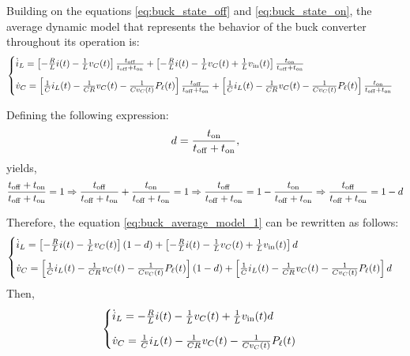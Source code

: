 Building on the equations \eqref{eq:buck_state_off} and \eqref{eq:buck_state_on}, the average dynamic model that represents the behavior of the buck converter throughout its operation is:
\begin{equation}
  \begin{cases}
    \dot i_L = \left[- \frac{R} L i(t) - \frac{1}{L} v_C(t) \right] \frac{t_{\rm{off}}}{t_{\rm{off}} + t_{\rm{on}}} + \left[- \frac{R} L i(t) - \frac{1}{L} v_C(t) + \frac{1}{L} v_{\rm{in}}(t)\right] \frac{t_{\rm{on}}}{t_{\rm{off}} + t_{\rm{on}}} \\[8pt]
    \dot v_C = \left[\frac{1}{C} i_L(t) - \frac{1}{C R} v_C(t) - \frac{1}{C v_C(t)} P_{\ell}(t)\right] \frac{t_{\rm{off}}}{t_{\rm{off}} + t_{\rm{on}}} + \left[\frac{1}{C} i_L(t) - \frac{1}{C R} v_C(t) - \frac{1}{C v_C(t)} P_{\ell}(t)\right] \frac{t_{\rm{on}}}{t_{\rm{off}} + t_{\rm{on}}}
  \end{cases}
  \label{eq:buck_average_model_1}
\end{equation}

Defining the following expression:
\begin{equation}
  d = \frac{t_{\rm{on}}}{t_{\rm{off}} + t_{\rm{on}}},
\end{equation}
yields,
\begin{equation}
  \frac{t_{\rm{off}} + t_{\rm{on}}}{t_{\rm{off}} + t_{\rm{on}}} = 1 \Rightarrow
  \frac{t_{\rm{off}}}{t_{\rm{off}} + t_{\rm{on}}}
  + \frac{t_{\rm{on}}}{t_{\rm{off}} + t_{\rm{on}}} = 1 \Rightarrow
  \frac{t_{\rm{off}}}{t_{\rm{off}} + t_{\rm{on}}} = 1 - \frac{t_{\rm{on}}}{t_{\rm{off}} + t_{\rm{on}}} \Rightarrow
  \frac{t_{\rm{off}}}{t_{\rm{off}} + t_{\rm{on}}} = 1 - d
\end{equation}

Therefore, the equation \eqref{eq:buck_average_model_1} can be rewritten as follows:
\begin{equation*}
  \begin{cases}
    \dot i_L = \left[- \frac{R} L i(t) - \frac{1}{L} v_C(t) \right] \left(1 - d\right) + \left[- \frac{R} L i(t) - \frac{1}{L} v_C(t) + \frac{1}{L} v_{\rm{in}}(t)\right] d \\[8pt]
    \dot v_C = \left[\frac{1}{C} i_L(t) - \frac{1}{C R} v_C(t) - \frac{1}{C v_C(t)} P_{\ell}(t)\right] \left(1 - d\right) + \left[\frac{1}{C} i_L(t) - \frac{1}{C R} v_C(t) - \frac{1}{C v_C(t)} P_{\ell}(t)\right] d
  \end{cases}
\end{equation*}
Then,
\begin{equation}
  \begin{cases}
    \dot i_L = - \frac{R} L i(t) - \frac{1}{L} v_C(t) + \frac{1}{L} v_{\rm{in}}(t) d \\[8pt]
    \dot v_C = \frac{1}{C} i_L(t) - \frac{1}{C R} v_C(t) - \frac{1}{C v_C(t)} P_{\ell}(t)
  \end{cases}
  \label{eq:buck_conveter_nonlinear_model}
\end{equation}

